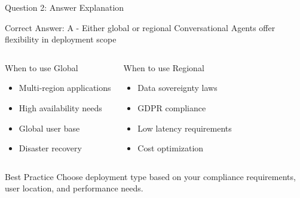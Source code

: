 \documentclass[aspectratio=169]{beamer}
\begin{document}
\begin{frame}{Question 2: Answer Explanation}
    \begin{alertblock}{Correct Answer: A - Either global or regional}
        \textcolor{googlegreen}{\faCheckCircle} Conversational Agents offer flexibility in deployment scope
    \end{alertblock}
    
    \begin{columns}
        \begin{block}{When to use Global}
            \begin{itemize}
                \item Multi-region applications
                \item High availability needs
                \item Global user base
                \item Disaster recovery
            \end{itemize}
        \end{block}
        
        \begin{block}{When to use Regional}
            \begin{itemize}
                \item Data sovereignty laws
                \item GDPR compliance
                \item Low latency requirements
                \item Cost optimization
            \end{itemize}
        \end{block}
    \end{columns}
    
    \vspace{0.5em}
    
    \begin{exampleblock}{Best Practice}
        Choose deployment type based on your compliance requirements, user location, and performance needs.
    \end{exampleblock}
\end{frame}
\end{document}
